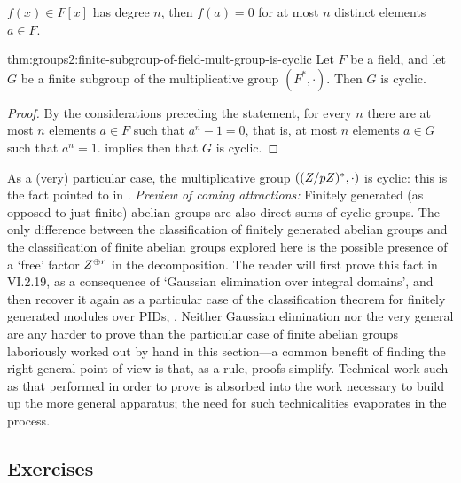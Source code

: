 $f(x) \in F[x]$ has degree $n$, then $f(a) = 0$ for at most $n$
distinct elements $a \in F$.
\begin{thm}{}{thm:groups2:finite-subgroup-of-field-mult-group-is-cyclic}
  Let $F$ be a field, and let $G$ be a finite subgroup of the
  multiplicative group $(F^*, \cdot)$. Then $G$ is cyclic.
\end{thm}
\begin{proof}
  By the considerations preceding the statement, for every $n$ there
  are at most $n$ elements $a \in F$ such that $a^n - 1 = 0$, that is,
  at most $n$ elements $a \in G$ such that $a^n = 1$.
   implies then that $G$ is cyclic.
\end{proof}

As a (very) particular case, the multiplicative group
$((Z/pZ)^*, \cdot)$ is cyclic: this is the fact pointed to in
.  \emph{Preview of coming
  attractions:} Finitely generated (as opposed to just finite) abelian
groups are also direct sums of cyclic groups.  The only difference
between the classification of finitely generated abelian groups and
the classification of finite abelian groups explored here is the
possible presence of a `free' factor $Z^{\oplus r}$ in the
decomposition. The reader will first prove this fact in VI.2.19, as a
consequence of `Gaussian elimination over integral domains', and then
recover it again as a particular case of the classification theorem
for finitely generated modules over PIDs, . Neither
Gaussian elimination nor the very general  are any
harder to prove than the particular case of finite abelian groups
laboriously worked out by hand in this section---a common benefit of
finding the right general point of view is that, as a rule, proofs
simplify. Technical work such as that performed in order to prove
 is absorbed into the work necessary to build up
the more general apparatus; the need for such technicalities
evaporates in the process.

\subsection*{Exercises}

